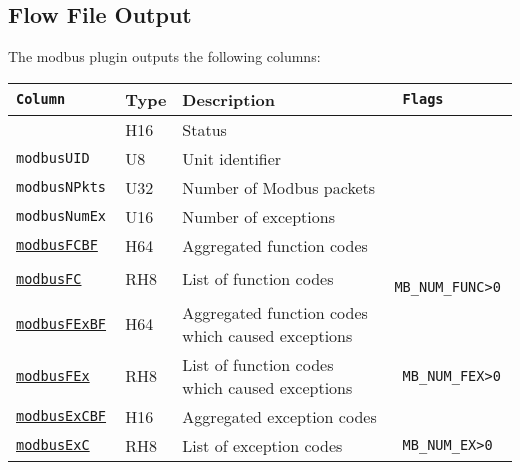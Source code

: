 \documentclass[documentation]{subfiles}
\begin{document}
\subsection{Flow File Output}
The modbus plugin outputs the following columns:
\begin{longtable}{>{\tt}lll>{\tt\small}l}
    \toprule
    {\bf Column}                      & {\bf Type} & {\bf Description}                                 & {\bf Flags}\\
    \midrule\endhead%
    \nameref{modbusStat}              & H16        & Status                                            & \\
    modbusUID                         & U8         & Unit identifier                                   & \\
    modbusNPkts                       & U32        & Number of Modbus packets                          & \\
    modbusNumEx                       & U16        & Number of exceptions                              & \\
    \hyperref[modbusFC]{modbusFCBF}   & H64        & Aggregated function codes                         & \\
    \hyperref[modbusFC]{modbusFC}     & RH8        & List of function codes                            & MB\_NUM\_FUNC>0\\
    \hyperref[modbusFEx]{modbusFExBF} & H64        & Aggregated function codes which caused exceptions & \\
    \hyperref[modbusFEx]{modbusFEx}   & RH8        & List of function codes which caused exceptions    & MB\_NUM\_FEX>0\\
    \hyperref[modbusExC]{modbusExCBF} & H16        & Aggregated exception codes                        & \\
    \hyperref[modbusExC]{modbusExC}   & RH8        & List of exception codes                           & MB\_NUM\_EX>0\\
    \bottomrule
\end{longtable}

\clearpage
\end{document}
